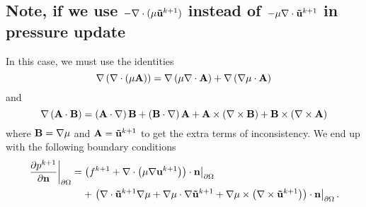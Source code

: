 \documentclass[letterpaper]{erdc}
\begin{document}
\subsection{Note, if we use $-\nabla\cdot(\mu\mathbf{\tilde{u}}^{k+1})$ instead of $-\mu\nabla\cdot\mathbf{\tilde{u}}^{k+1}$ in pressure update}
In this case, we must use the identities
\begin{equation}
    \nabla\left( \nabla\cdot\left( \mu \mathbf{A}\right) \right) = \nabla\left(\mu\nabla\cdot\mathbf{A}\right) + \nabla\left( \nabla\mu\cdot\mathbf{A} \right)
\end{equation}
and 
\begin{equation}
  \nabla\left(\mathbf{A}\cdot \mathbf{B}\right) = \left( \mathbf{A}\cdot\nabla\right)\mathbf{B} + \left( \mathbf{B}\cdot\nabla\right)\mathbf{A} + \mathbf{A}\times\left(\nabla\times\mathbf{B}\right) + \mathbf{B}\times\left(\nabla\times\mathbf{A}\right)
\end{equation}
  where $\mathbf{B} = \nabla\mu$ and $\mathbf{A} = \mathbf{\tilde{u}}^{k+1}$ to get the extra terms of inconsistency.  We end up with the following boundary conditions
\begin{equation}
  \begin{split}\left.\frac{\partial p^{k+1}}{\partial \textbf{n}}\right|_{\partial\Omega} = &\left.\left(f^{k+1} + \nabla\cdot\left(\mu\nabla\textbf{u}^{k+1}\right) \right)\cdot \textbf{n}\right|_{\partial\Omega}\\ &+ \left.\left(\nabla\cdot\mathbf{\tilde{u}}^{k+1}\nabla\mu  + \nabla\mu\cdot\nabla\mathbf{\tilde{u}}^{k+1} + \nabla\mu\times\left( \nabla\times\mathbf{\tilde{u}}^{k+1}\right) \right)\cdot\textbf{n}\right|_{\partial\Omega}. \end{split}
\end{equation}





%
%
\end{document}
